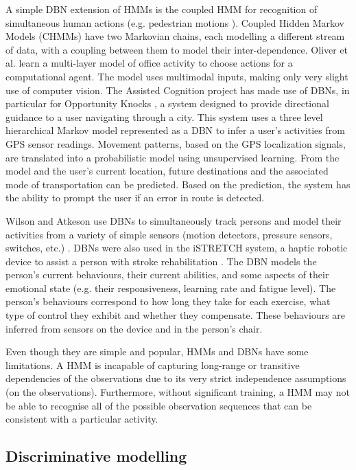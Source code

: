 A simple DBN extension of HMMs is the coupled HMM for recognition of simultaneous human actions (e.g. pedestrian motions \cite{Brand1997}). Coupled Hidden Markov Models (CHMMs) have two Markovian chains, each modelling a different stream of data, with a coupling between them to model their inter-dependence. Oliver et al. \cite{Oliver2004} learn a multi-layer model of office activity to choose actions for a computational agent. The model uses multimodal inputs, making only very slight use of computer vision. The Assisted Cognition project \cite{Kautz2002} has made use of DBNs, in particular for Opportunity Knocks \cite{Liao2007a}, a system designed to provide directional guidance to a user navigating through a city. This system uses a three level hierarchical Markov model represented as a DBN to infer a user’s activities from GPS sensor readings. Movement patterns, based on the GPS localization signals, are translated into a probabilistic model using unsupervised learning. From the model and the user’s current location, future destinations and the associated mode of transportation can be predicted. Based on the prediction, the system has the ability to prompt the user if an error in route is detected.

Wilson and Atkeson use DBNs to simultaneously track persons and model their activities from a variety of simple sensors (motion detectors, pressure sensors, switches, etc.) \cite{Wilson2005}. DBNs were also used in the iSTRETCH system, a haptic robotic device to assist a person with stroke rehabilitation \cite{Kan2011}. The DBN models the person’s current behaviours, their current abilities, and some aspects of their emotional state (e.g. their responsiveness, learning rate and fatigue level). The person’s behaviours correspond to how long they take for each exercise, what type of control they exhibit and whether they compensate. These behaviours are inferred from sensors on the device and in the person’s chair.

Even though they are simple and popular, HMMs and DBNs have some limitations. A HMM is incapable of capturing long-range or transitive dependencies of the observations due to its very strict independence assumptions (on the observations). Furthermore, without significant training, a HMM may not be able to recognise all of the possible observation sequences that can be consistent with a particular activity.

\subsection{Discriminative modelling}

